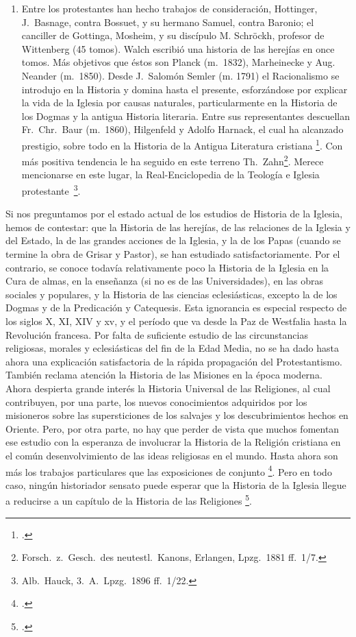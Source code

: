 \raggedbottom{} \documentclass[12pt, a4paper, openany]{book} %
\begin{document}
\begin{enumerate}
  \item Entre los protestantes han hecho trabajos de consideración, Hottinger, J.\ Basnage, contra Bossuet, y su hermano Samuel, contra Baronio; el canciller de Gottinga, Mosheim, y su discípulo M. Schröckh, profesor de Wittenberg (45 tomos). Walch escribió una historia de las herejías en once tomos. Más objetivos que éstos son Planck (m.\ 1832), Marheinecke y Aug. Neander (m.\ 1850). Desde J.\ Salomón Semler (m. 1791) el Racionalismo se introdujo en la Historia y domina hasta el presente, esforzándose por explicar la vida de la Iglesia por causas naturales, particularmente en la Historia de los Dogmas y la antigua Historia literaria. Entre sus representantes descuellan Fr.\ Chr.\ Baur (m.\ 1860), Hilgenfeld y Adolfo Harnack, el cual ha alcanzado prestigio, sobre todo en la Historia de la Antigua Literatura cristiana \footcite{HilgenfeldHarnack1884Dogmengeschichte}. Con más positiva tendencia le ha seguido en este terreno Th.\ Zahn\footnote{Forsch.\ z.\ Gesch.\ des neutestl.\ Kanons, Erlangen, Lpzg.\ 1881 ff.\ 1/7.}. Merece mencionarse en este lugar, la Real-Enciclopedia de la Teología e Iglesia protestante\ \footnote{Alb.\ Hauck, 3.\ A.\ Lpzg.\ 1896 ff.\ 1/22.}.
\end{enumerate}

Si nos preguntamos por el estado actual de los estudios de Historia de la Iglesia, hemos de contestar: que la Historia de las herejías, de las relaciones de la Iglesia y del Estado, la de las grandes acciones de la Iglesia, y la de los Papas (cuando se termine la obra de Grisar y Pastor), se han estudiado satisfactoriamente. Por el contrario, se conoce todavía relativamente poco la Historia de la Iglesia en la Cura de almas, en la enseñanza (si no es de las Universidades), en las obras sociales y populares, y la Historia de las ciencias eclesiásticas, excepto la de los Dogmas y de la Predicación y Catequesis. Esta ignorancia es especial respecto de los siglos X, XI, XIV y xv, y el período que va desde la Paz de Westfalia hasta la Revolución francesa. Por falta de suficiente estudio de las circunstancias religiosas, morales y eclesiásticas del fin de la Edad Media, no se ha dado hasta ahora una explicación satisfactoria de la rápida propagación del Protestantismo. También reclama atención la Historia de las Misiones en la época moderna. Ahora despierta grande interés la Historia Universal de las Religiones, al cual contribuyen, por una parte, los nuevos conocimientos adquiridos por los misioneros sobre las supersticiones de los salvajes y los descubrimientos hechos en Oriente. Pero, por otra parte, no hay que perder de vista que muchos fomentan ese estudio con la esperanza de involucrar la Historia de la Religión cristiana en el común desenvolvimiento de las ideas religiosas en el mundo. Hasta ahora son más los trabajos particulares que las exposiciones de conjunto \footcite{Saussaye1898Religionsgeschichte}. Pero en todo caso, ningún historiador sensato puede esperar que la Historia de la Iglesia llegue a reducirse a un capítulo de la Historia de las Religiones \footcite{Shrors1905Nicht}.
\end{document}
